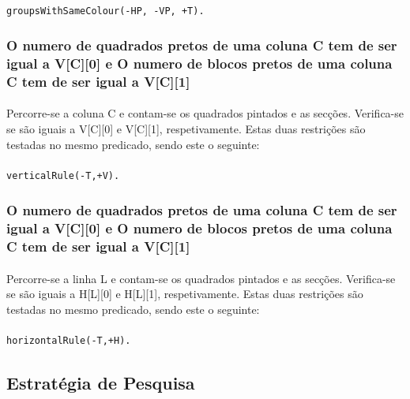 \documentclass[runningheads,a4paper]{llncs}
\begin{document}
\paragraph{}
\begin{lstlisting}
groupsWithSameColour(-HP, -VP, +T).
\end{lstlisting}

\subsubsection{O numero de quadrados pretos de uma coluna C tem de ser igual a V[C][0] e O numero de blocos pretos de uma coluna C tem de ser igual a V[C][1]}
\paragraph{}
Percorre-se a coluna C e contam-se os quadrados pintados e as secções. Verifica-se se são iguais a V[C][0] e V[C][1], respetivamente.
Estas duas restrições são testadas no mesmo predicado, sendo este o seguinte:
\paragraph{}
\begin{lstlisting}
verticalRule(-T,+V).
\end{lstlisting}

\subsubsection{O numero de quadrados pretos de uma coluna C tem de ser igual a V[C][0] e O numero de blocos pretos de uma coluna C tem de ser igual a V[C][1]}
\paragraph{}
Percorre-se a linha L e contam-se os quadrados pintados e as secções. Verifica-se se são iguais a H[L][0] e H[L][1], respetivamente.
Estas duas restrições são testadas no mesmo predicado, sendo este o seguinte:
\paragraph{}
\begin{lstlisting}
horizontalRule(-T,+H).
\end{lstlisting}

\subsection{Estratégia de Pesquisa}
\end{document}

